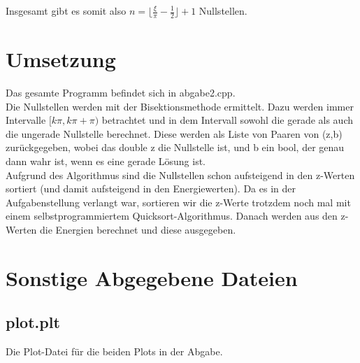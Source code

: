 \documentclass{scrartcl}
\begin{document}
Insgesamt gibt es somit also $n = \lfloor\frac{\xi}{\pi}-\frac{1}{2}\rfloor + 1$ Nullstellen.\\

\section*{Umsetzung}
Das gesamte Programm befindet sich in abgabe2.cpp.\\
Die Nullstellen werden mit der Bisektionsmethode ermittelt. Dazu werden immer Intervalle $[k\pi,k\pi+\pi)$ betrachtet und in dem Intervall sowohl die gerade als auch die ungerade Nullstelle berechnet. Diese werden als Liste von Paaren von (z,b) zurückgegeben, wobei das double z die Nullstelle ist, und b ein bool, der genau dann wahr ist, wenn es eine gerade Lösung ist.\\
Aufgrund des Algorithmus sind die Nullstellen schon aufsteigend in den z-Werten sortiert (und damit aufsteigend in den Energiewerten). Da es in der Aufgabenstellung verlangt war, sortieren wir die z-Werte trotzdem noch mal mit einem selbstprogrammiertem Quicksort-Algorithmus. Danach werden aus den z-Werten die Energien berechnet und diese ausgegeben. 
  

\section*{Sonstige Abgegebene Dateien}
\subsection*{plot.plt}
Die Plot-Datei für die beiden Plots in der Abgabe.
\end{document}
